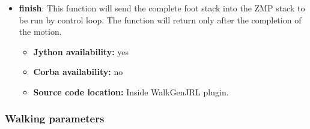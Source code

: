 \begin{itemize}
\item {\bf finish}: This function will send the complete foot stack into 
the ZMP stack to be run by control loop.
The function will return only after the completion of the motion.

\begin{itemize}
\item \textbf{Jython availability:} yes
\item \textbf{Corba availability:} no
\item \textbf{Source code location:} Inside WalkGenJRL plugin.
\end{itemize}

\end{itemize}

\subsubsection{Walking parameters}
